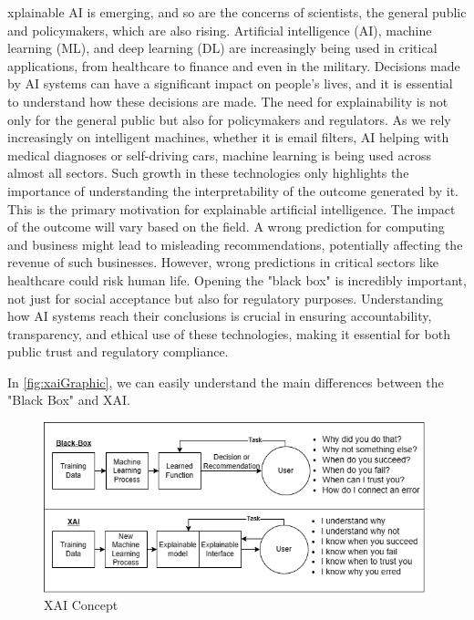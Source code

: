 \documentclass[10pt,journal,compsoc]{IEEEtran}
\begin{document}
xplainable AI is emerging, and so are the concerns of scientists, the general public and policymakers, which are also rising. 
Artificial intelligence (AI), machine learning (ML), and deep learning (DL) are increasingly being used in critical applications, from healthcare to finance and even in the military. Decisions made by AI systems can have a significant impact on people's lives, and it is essential to understand how these decisions are made.\cite{analytical-review} 
The need for explainability is not only for the general public but also for policymakers and regulators. As we rely increasingly on intelligent machines, whether it is email filters, AI helping with medical diagnoses or self-driving cars, machine learning is being used across almost all sectors. Such growth in these technologies only highlights the importance of understanding the interpretability of the outcome generated by it. This is the primary motivation for explainable artificial intelligence.\cite{doshivelez2017rigorous}
The impact of the outcome will vary based on the field. A wrong prediction for computing and business might lead to misleading recommendations, potentially affecting the revenue of such businesses. However, wrong predictions in critical sectors like healthcare could risk human life. Opening the "black box" is incredibly important, not just for social acceptance but also for regulatory purposes. Understanding how AI systems reach their conclusions is crucial in ensuring accountability, transparency, and ethical use of these technologies, making it essential for both public trust and regulatory compliance.\cite{analytical-review}

In \autoref{fig:xaiGraphic}, we can easily understand the main differences between the "Black Box" and XAI.\cite{xai-concept}

\begin{figure}[h]
    \centering
    \includegraphics[scale=0.37]{images/xaiGraphic.png}
    \caption{XAI Concept}
    \label{fig:xaiGraphic}
\end{figure}
\end{document}
